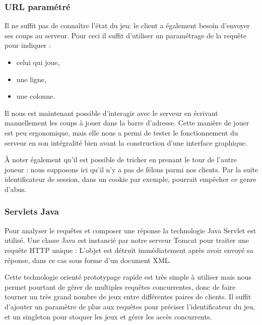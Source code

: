 \subsubsection{URL paramétré}
Il ne suffit pas de connaître l'état du jeu: le client a également besoin d'envoyer ses coups au serveur. Pour ceci il suffit d'utiliser un paramétrage de la requête pour indiquer :
\begin{itemize}
\item celui qui joue,
\item une ligne,
\item une colonne.
\end{itemize}
Il nous est maintenant possible d'interagir avec le serveur en écrivant manuellement les coups à jouer dans la barre d'adresse. Cette manière de jouer est peu ergonomique, mais elle nous a permi de tester le fonctionnement du serveur en son intégralité bien avant la construction d'une interface graphique.

À noter également qu'il est possible de \og tricher \fg{} en prenant le tour de l'autre joueur  : nous supposons ici qu'il n'y a pas de félons parmi nos clients. Par la suite identificateur de session, dans un cookie par exemple, pourrait empêcher ce genre d'abus. 
\subsubsection{Servlets Java}
Pour analyser  le requêtes  et composer une réponse la technologie \og Java Servlet \fg {} est utilisé. Une classe Java est instancié par notre serveur Tomcat pour traiter une requête HTTP unique : L'objet est détruit immédiatement après avoir envoyé sa réponse, dans ce cas sous forme d'un document XML.

Cette technologie orienté prototypage rapide est très simple à utiliser mais nous permet pourtant de gérer de multiples requêtes concurrentes, donc de faire tourner un très grand nombre de jeux entre différentes paires de clients. Il suffit d'ajouter un paramètre de plus aux requêtes pour préciser l'identificateur du jeu, et un singleton pour stoquer les jeux et gérer les accès concurrents.
